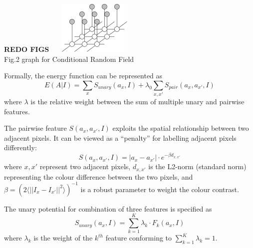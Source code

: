 \documentclass[10pt,twocolumn,letterpaper]{article}
\newcommand{\SUM}{\sum\limits}
\newcommand{\BOLD}{\textbf}
\begin{document}
    \begin{center}
    	\BOLD{REDO FIGS}
        \includegraphics[width=1.8in,height=1in]{./Figures/mrf.jpg} \\
        \footnotesize Fig.2 graph for Conditional Random Field
        \end{center}


Formally, the energy function can be represented as $$E(A|I) = \SUM_x S_{unary}(a_x,I) + \lambda_0 \SUM_{x,x'}S_{pair}(a_x,a_{x'},I)$$ where $\lambda$ is the relative weight between the sum of multiple unary  and pairwise features. 

The pairwise feature $S(a_x,a_{x'},I)$ exploits the spatial relationship between two adjacent pixels.  It can be viewed as a ``penalty'' for labelling adjacent pixels differently: $$S(a_x,a_{x'},I) = |a_x-a_{x'}| \cdot e^{-\beta d_{x,x'}}$$ where $x,x'$ represent two adjacent pixels, $d_{x,x'}$ is the L2-norm (standard norm) representing the colour difference between the two pixels, and $\beta=(2\langle||I_x-I_{x'}||^2\rangle)^{-1}$ is a robust parameter to weight the colour contrast.

The unary potential for combination of three features is specified as $$S_{unary}(a_x,I) = \SUM_{k=1}^K \lambda_k \cdot F_k(a_x,I)$$ where $\lambda_k$ is the weight of the $k^{th}$ feature conforming to $\sum_{k=1}^{K} \lambda_k = 1$.
\end{document}
